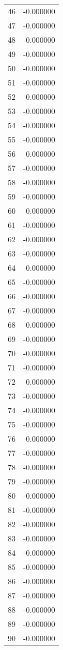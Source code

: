 \documentclass[12pt]{article}
\begin{document}
\begin{longtable}{@{}cc@{}}
46 & -0.000000 \\
47 & -0.000000 \\
48 & -0.000000 \\
49 & -0.000000 \\
50 & -0.000000 \\
51 & -0.000000 \\
52 & -0.000000 \\
53 & -0.000000 \\
54 & -0.000000 \\
55 & -0.000000 \\
56 & -0.000000 \\
57 & -0.000000 \\
58 & -0.000000 \\
59 & -0.000000 \\
60 & -0.000000 \\
61 & -0.000000 \\
62 & -0.000000 \\
63 & -0.000000 \\
64 & -0.000000 \\
65 & -0.000000 \\
66 & -0.000000 \\
67 & -0.000000 \\
68 & -0.000000 \\
69 & -0.000000 \\
70 & -0.000000 \\
71 & -0.000000 \\
72 & -0.000000 \\
73 & -0.000000 \\
74 & -0.000000 \\
75 & -0.000000 \\
76 & -0.000000 \\
77 & -0.000000 \\
78 & -0.000000 \\
79 & -0.000000 \\
80 & -0.000000 \\
81 & -0.000000 \\
82 & -0.000000 \\
83 & -0.000000 \\
84 & -0.000000 \\
85 & -0.000000 \\
86 & -0.000000 \\
87 & -0.000000 \\
88 & -0.000000 \\
89 & -0.000000 \\
90 & -0.000000 \\

\end{longtable}
\end{document}
